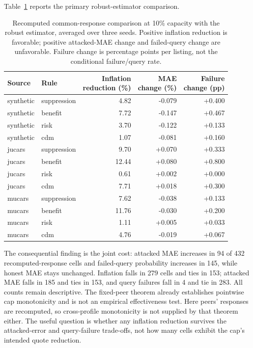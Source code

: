 \documentclass[11pt]{article}
\begin{document}
Table~\ref{tab:cap_responses} reports the primary robust-estimator comparison.
\begin{table}[ht]
\centering\small
\caption{Recomputed common-response comparison at 10\% capacity with the robust
estimator, averaged over three seeds. Positive inflation reduction is favorable;
positive attacked-MAE change and failed-query change are unfavorable. Failure
change is percentage points per listing, not the conditional failure/query rate.}
\label{tab:cap_responses}
\begin{tabular}{llrrr}\toprule
Source & Rule & \shortstack{Inflation\\reduction (\%)} & \shortstack{MAE\\change (\%)} & \shortstack{Failure\\change (pp)}\\\midrule
synthetic & suppression & 4.82 & -0.079 & +0.400 \\
synthetic & benefit & 7.72 & -0.147 & +0.467 \\
synthetic & risk & 3.70 & -0.122 & +0.133 \\
synthetic & cdm & 1.07 & -0.081 & +0.160 \\
jucars & suppression & 9.70 & +0.070 & +0.333 \\
jucars & benefit & 12.44 & +0.080 & +0.800 \\
jucars & risk & 0.61 & +0.002 & +0.000 \\
jucars & cdm & 7.71 & +0.018 & +0.300 \\
mucars & suppression & 7.62 & -0.038 & +0.133 \\
mucars & benefit & 11.76 & -0.030 & +0.200 \\
mucars & risk & 1.11 & +0.005 & +0.033 \\
mucars & cdm & 4.76 & -0.019 & +0.067 \\
\bottomrule\end{tabular}
\end{table}

The consequential finding is the joint cost: attacked MAE increases in 94
of 432 recomputed-response cells and failed-query probability increases in
145, while honest MAE stays unchanged. Inflation falls in 279 cells and ties
in 153; attacked MAE falls in 185 and ties in 153, and query failures fall
in 4 and tie in 283. All counts remain descriptive. The fixed-peer theorem
already establishes pointwise cap monotonicity and is not an empirical
effectiveness test. Here peers' responses are recomputed, so cross-profile
monotonicity is not supplied by that theorem either. The useful question is
whether any inflation reduction survives the attacked-error and query-failure
trade-offs, not how many cells exhibit the cap's intended quote reduction.
\end{document}

